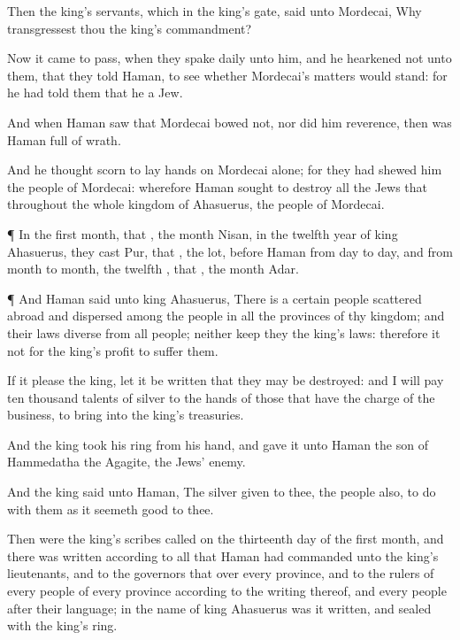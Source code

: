 {Then the
king’s
servants, which
{} in the
king’s
gate,
said unto
Mordecai, Why
transgressest thou the
king’s
commandment?

Now it came to pass, when they
spake
daily unto him, and he
hearkened not unto them, that they
told
Haman, to
see whether
Mordecai’s
matters would
stand: for he had
told them that he
{} a
Jew.

And when
Haman
saw that
Mordecai
bowed not, nor did him
reverence, then was
Haman
full of
wrath.

And he
thought
scorn to
lay
hands on
Mordecai alone; for they had
shewed him the
people of
Mordecai: wherefore
Haman
sought to
destroy all the
Jews that
{} throughout the whole
kingdom of
Ahasuerus,
{} the
people of
Mordecai.


\par }{\PP {}¶ In the
first
month, that
{}, the
month
Nisan, in the
twelfth
year of
king
Ahasuerus, they
cast
Pur, that
{}, the
lot,
before
Haman from
day to
day, and from
month to
month,
{} the
twelfth
{}, that
{}, the
month
Adar.


\par }{\PP {}¶ And
Haman
said unto
king
Ahasuerus, There
is a
certain
people scattered
abroad and
dispersed among the
people in all the
provinces of thy
kingdom; and their
laws
{}
diverse from all
people; neither
keep they the
king’s
laws: therefore it
{} not for the
king’s
profit to
suffer them.

If it
please the
king, let it be
written that they may be
destroyed: and I will
pay
ten
thousand
talents of
silver to the
hands of those that have the
charge of the
business, to
bring
{} into the
king’s
treasuries.

And the
king
took his
ring from his
hand, and
gave it unto
Haman the
son of
Hammedatha the
Agagite, the
Jews’
enemy.

And the
king
said unto
Haman, The
silver
{}
given to thee, the
people also, to
do with them as it
seemeth
good to thee.

Then were the
king’s
scribes
called on the
thirteenth
day of the
first
month, and there was
written according to all that
Haman had
commanded unto the
king’s
lieutenants, and to the
governors that
{} over every
province, and to the
rulers of every
people of every
province according to the
writing thereof, and
{} every
people after their
language; in the
name of
king
Ahasuerus was it
written, and
sealed with the
king’s
ring.

}
